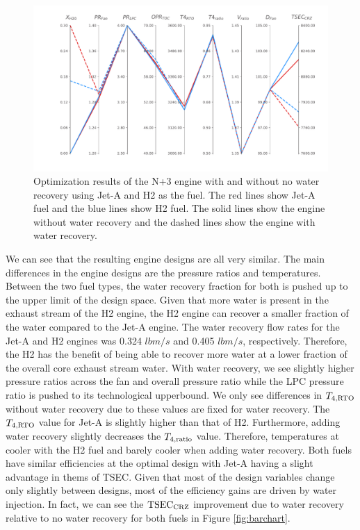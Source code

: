 \documentclass[conf]{new-aiaa}
\begin{document}
\begin{figure}[hbt!]
    \centering
    \includegraphics[width=1.0\textwidth]{N3_parallel_coords.pdf}
    \caption{Optimization results of the N+3 engine with and without no water recovery using Jet-A and H2 as the fuel.
        The red lines show Jet-A fuel and the blue lines show H2 fuel.
        The solid lines show the engine without water recovery and the dashed lines show the engine with water recovery.}
    \label{fig:parallel_coords}
\end{figure}

We can see that the resulting engine designs are all very similar.
The main differences in the engine designs are the pressure ratios and temperatures.
Between the two fuel types, the water recovery fraction for both is pushed up to the upper limit of the design space.
Given that more water is present in the exhaust stream of the H2 engine, the H2 engine can recover a smaller fraction of the water compared to the Jet-A engine.
The water recovery flow rates for the Jet-A and H2 engines was 0.324 $\si{lbm/s}$ and 0.405 $\si{lbm/s}$, respectively.
Therefore, the H2 has the benefit of being able to recover more water at a lower fraction of the overall core exhaust stream water.
With water recovery, we see slightly higher pressure ratios across the fan and overall pressure ratio while the LPC pressure ratio is pushed to its technological upperbound.
We only see differences in $T_{4,\rm{RTO}}$ without water recovery due to these values are fixed for water recovery.
The $T_{4,\rm{RTO}}$ value for Jet-A is slightly higher than that of H2.
Furthermore, adding water recovery slightly decreases the $T_{4,\rm{ratio}}$ value.
Therefore, temperatures at cooler with the H2 fuel and barely cooler when adding water recovery.
Both fuels have similar efficiencies at the optimal design with Jet-A having a slight advantage in thems of TSEC.
Given that most of the design variables change only slightly between designs, most of the efficiency gains are driven by water injection.
In fact, we can see the $\rm{TSEC}_{\rm{CRZ}}$ improvement due to water recovery relative to no water recovery for both fuels in Figure \ref{fig:barchart}.
\end{document}
